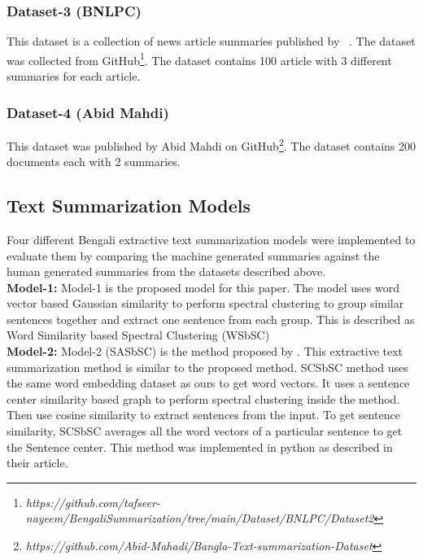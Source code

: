 \subsubsection{Dataset-3 (BNLPC)}
This dataset is a collection of news article summaries published by \citeauthor{Hque-2015-BNLPC-Dataset}~\cite{Hque-2015-BNLPC-Dataset}.
The dataset was collected from
GitHub\footnote{\textit{https://github.com/tafseer-nayeem/BengaliSummarization/tree/main/Dataset/BNLPC/Dataset2}}.
The dataset contains 100 article with 3 different summaries for each article.

\subsubsection{Dataset-4 (Abid Mahdi)}
This dataset was published by Abid Mahdi on
GitHub\footnote{\textit{https://github.com/Abid-Mahadi/Bangla-Text-summarization-Dataset}}.
The dataset contains 200 documents each with 2 summaries.

\subsection{Text Summarization Models}\label{subsec:text-summarization-models}
Four different Bengali extractive text summarization models were implemented to evaluate them by
comparing the machine generated summaries against the human generated summaries from the datasets described above.\\

\textbf{Model-1:} Model-1 is the proposed model for this paper.
The model uses word vector based Gaussian similarity to perform spectral clustering to group similar
sentences together and extract one sentence from each group.
This is described as Word Similarity based Spectral Clustering (WSbSC)\\

\textbf{Model-2:} Model-2 (SASbSC) is the method proposed by \citeauthor{roychowdhury-etal-2022-spectral-base}
\cite{roychowdhury-etal-2022-spectral-base}.
This extractive text summarization method is similar to the proposed method.
SCSbSC method uses the same word embedding dataset as ours to get word vectors.
It uses a sentence center similarity based graph to perform spectral clustering inside the method.
Then use cosine similarity to extract sentences from the input.
To get sentence similarity, SCSbSC averages all the word vectors of a particular sentence to get the Sentence center.
This method was implemented in python as described in their article.\\

